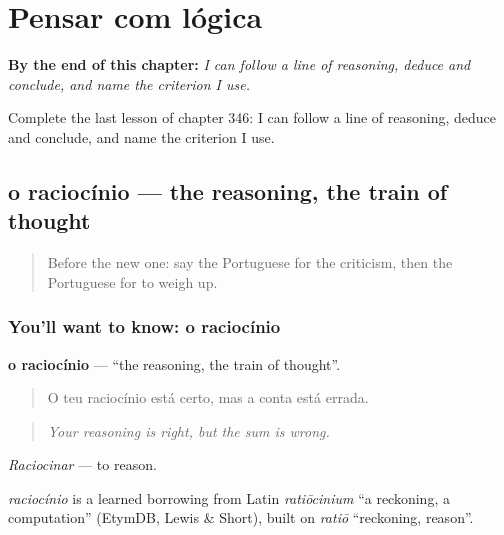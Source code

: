 
\chapter{Pensar com lógica}
\label{ch:pt-pensar-com-logica}

\begin{chapteropening}
\textbf{By the end of this chapter:} \emph{I can follow a line of reasoning, deduce and conclude, and name the criterion I use.}

Complete the last lesson of chapter 346: I can follow a line of reasoning, deduce and conclude, and name the criterion I use.
\end{chapteropening}

\section[o raciocínio]{o raciocínio — the reasoning, the train of thought}

\label{lesson:PT-C346-raciocinio}



\begin{quote}
Before the new one: say the Portuguese for the criticism, then the Portuguese for to weigh up.
\end{quote}

\subsection*{You'll want to know: o raciocínio}
\textbf{o raciocínio} — \textquotedblleft{}the reasoning, the train of thought\textquotedblright{}.

\begin{quote}
O teu raciocínio está certo, mas a conta está errada.
\end{quote}

\begin{quote}
\emph{Your reasoning is right, but the sum is wrong.}
\end{quote}

\emph{Raciocinar} — to reason.

\begin{cousinweb}
\emph{raciocínio} is a learned borrowing from Latin \emph{ratiōcinium} \textquotedblleft{}a reckoning, a computation\textquotedblright{} (EtymDB, Lewis \& Short), built on \emph{ratiō} \textquotedblleft{}reckoning, reason\textquotedblright{}.
\end{cousinweb}

